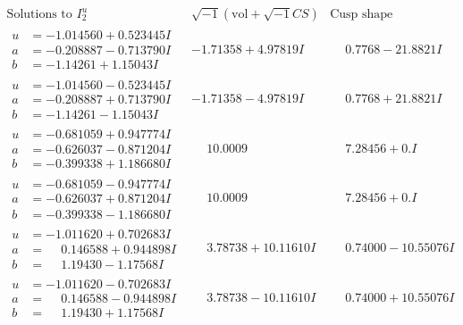 \documentclass[1p]{elsarticle_modified}
\theoremstyle{definition}
\newcommand{\I}{\sqrt{-1}}
\begin{document}
$$\begin{array}{c|c|c}  
\text{Solutions to }I^u_{2}& \I (\text{vol} + \sqrt{-1}CS) & \text{Cusp shape}\\
 \hline 
\begin{aligned}
u &= -1.014560 + 0.523445 I \\
a &= -0.208887 - 0.713790 I \\
b &= -1.14261 + 1.15043 I\end{aligned}
 & -1.71358 + 4.97819 I & \phantom{-}0.7768 - 21.8821 I \\ \hline\begin{aligned}
u &= -1.014560 - 0.523445 I \\
a &= -0.208887 + 0.713790 I \\
b &= -1.14261 - 1.15043 I\end{aligned}
 & -1.71358 - 4.97819 I & \phantom{-}0.7768 + 21.8821 I \\ \hline\begin{aligned}
u &= -0.681059 + 0.947774 I \\
a &= -0.626037 - 0.871204 I \\
b &= -0.399338 + 1.186680 I\end{aligned}
 & \phantom{-}10.0009\phantom{ +0.000000I} & \phantom{-}7.28456 + 0. I\phantom{ +0.000000I} \\ \hline\begin{aligned}
u &= -0.681059 - 0.947774 I \\
a &= -0.626037 + 0.871204 I \\
b &= -0.399338 - 1.186680 I\end{aligned}
 & \phantom{-}10.0009\phantom{ +0.000000I} & \phantom{-}7.28456 + 0. I\phantom{ +0.000000I} \\ \hline\begin{aligned}
u &= -1.011620 + 0.702683 I \\
a &= \phantom{-}0.146588 + 0.944898 I \\
b &= \phantom{-}1.19430 - 1.17568 I\end{aligned}
 & \phantom{-}3.78738 + 10.11610 I & \phantom{-}0.74000 - 10.55076 I \\ \hline\begin{aligned}
u &= -1.011620 - 0.702683 I \\
a &= \phantom{-}0.146588 - 0.944898 I \\
b &= \phantom{-}1.19430 + 1.17568 I\end{aligned}
 & \phantom{-}3.78738 - 10.11610 I & \phantom{-}0.74000 + 10.55076 I \\ \hline\begin{aligned}

\end{aligned}
\end{array}$$
\end{document}
